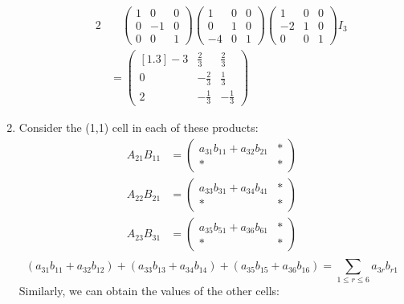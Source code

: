 \documentclass{article}
\begin{document}
\begin{enumerate}
\begin{enumerate}[label={(\roman*)}]
\begin{alignat*}{2}
        &\quad \begin{pmatrix}
          1 & 0 & 0 \\
          0 & -1 & 0 \\
          0 & 0 & 1
        \end{pmatrix}
        \begin{pmatrix}
          1 & 0 & 0 \\
          0 & 1 & 0 \\
          -4 & 0 & 1
        \end{pmatrix}
        \begin{pmatrix}
          1 & 0 & 0 \\
          -2 & 1 & 0 \\
          0 & 0 & 1
        \end{pmatrix}
        I_3 \\
        &= 
        \begin{pmatrix}[1.3]
          -3 & \frac{2}{3} & \frac{2}{3} \\
          0 & -\frac{2}{3} & \frac{1}{3} \\
          2 & - \frac{1}{3} & - \frac{1}{3}
        \end{pmatrix}
      \end{alignat*}
    \end{enumerate}
  \item
    Consider the (1,1) cell in each of these products:
    \begin{align*}
      A_{21} B_{11} &= \begin{pmatrix}
        a_{31} b_{11} + a_{32} b_{21} & * \\
        * & *
      \end{pmatrix} \\
      A_{22} B_{21} &= \begin{pmatrix}
        a_{33} b_{31} + a_{34} b_{41} & * \\
        * & *
      \end{pmatrix} \\
      A_{23} B_{31} &= \begin{pmatrix}
        a_{35} b_{51} + a_{36} b_{61} & * \\
        * & *
      \end{pmatrix} \\
    \end{align*}
    \[
      (a_{31} b_{11} + a_{32} b_{12}) + (a_{33} b_{13} + a_{34} b_{14}) + (a_{35} b_{15} + a_{36} b_{16}) = \sum_{1 \le r \le 6} a_{3r} b_{r1}
    \]
    Similarly, we can obtain the values of the other cells:

\end{enumerate}
\end{document}
